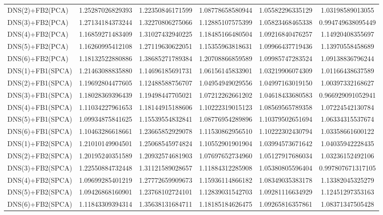 \begin{table}[htb]
\begin{adjustbox}{totalheight=\baselineskip}
\begin{tabular}{lSSSSS}
DNS(2)+FB2(PCA) & 1.25287026829393 & 1.22350846171599 & 1.08778658580944 & 1.05582296335129 & 1.03198589013055 \\ 
DNS(3)+FB2(PCA) & 1.27134184373244 & 1.32270806275066 & 1.12885107575399 & 1.05823468465338 & 0.994749638095449 \\ 
DNS(4)+FB2(PCA) & 1.16859271483409 & 1.31027432940225 & 1.18485166480504 & 1.09216840476257 & 1.14920408355697 \\ 
DNS(5)+FB2(PCA) & 1.16260995412108 & 1.27119630622051 & 1.15355963818631 & 1.09966437719436 & 1.13970558458689 \\ 
DNS(6)+FB2(PCA) & 1.18132522880886 & 1.38685271789384 & 1.20708866859589 & 1.09985747283524 & 1.09138836796244 \\ 
DNS(1)+FB1(SPCA) & 1.21463088835880 & 1.14696185691731 & 1.06156145833901 & 1.03219906074309 & 1.01166438637589 \\ 
DNS(2)+FB1(SPCA) & 1.19692804477605 & 1.12488588756707 & 1.04954949029556 & 1.04997163019150 & 1.00397332168627 \\ 
DNS(3)+FB1(SPCA) & 1.18028369396439 & 1.19498447705021 & 1.07212262661202 & 1.04618433680583 & 0.966929091052941 \\ 
DNS(4)+FB1(SPCA) & 1.11034227961653 & 1.18144915188606 & 1.10222319015123 & 1.08569565789358 & 1.07224542130784 \\ 
DNS(5)+FB1(SPCA) & 1.09934875841625 & 1.15539554832841 & 1.08776954289896 & 1.10379502651694 & 1.06334315537674 \\ 
DNS(6)+FB1(SPCA) & 1.10463286618661 & 1.23665852929078 & 1.11530862956510 & 1.10222302430794 & 1.03358661600122 \\ 
DNS(1)+FB2(SPCA) & 1.21010149904501 & 1.25068545974824 & 1.10552901901904 & 1.03994573671642 & 1.04035942228435 \\ 
DNS(2)+FB2(SPCA) & 1.20195240351589 & 1.20932574681903 & 1.07697652734960 & 1.05127917686034 & 1.03236152492106 \\ 
DNS(3)+FB2(SPCA) & 1.22550884732448 & 1.31121589028657 & 1.11884312285908 & 1.05380805596404 & 0.997807671317105 \\ 
DNS(4)+FB2(SPCA) & 1.09699285401219 & 1.27772659909673 & 1.15936114866182 & 1.08349035383178 & 1.13382045325279 \\ 
DNS(5)+FB2(SPCA) & 1.09426868160901 & 1.23768102724101 & 1.12839031542703 & 1.09281116634929 & 1.12451297353163 \\ 
DNS(6)+FB2(SPCA) & 1.11843309394314 & 1.35638131684711 & 1.18185184626475 & 1.09265816357861 & 1.08371347505428 \\ 

\end{tabular}
\end{adjustbox}
\end{table}
